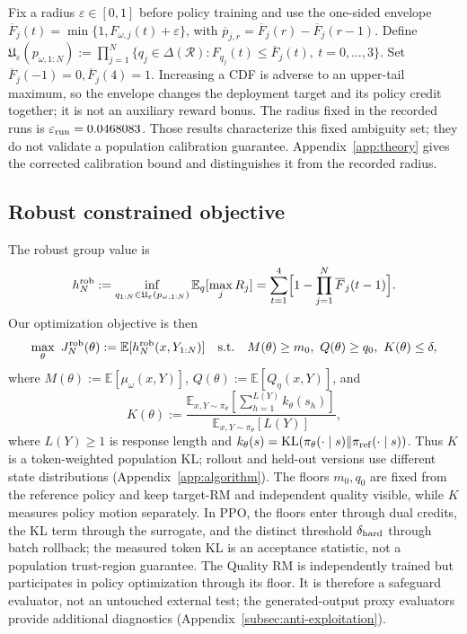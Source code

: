 \documentclass{article}
\theoremstyle{definition}
\theoremstyle{remark}
\begin{document}
Fix a radius \(\varepsilon\in[0,1]\) before policy training and use the
one-sided envelope
\(\overline F_j(t)=\min\{1,F_{\omega,j}(t)+\varepsilon\}\), with
\(\overline p_{j,r}=\overline F_j(r)-\overline F_j(r-1)\).  Define
\(\mathfrak U_{\varepsilon}(p_{\omega,1:N})
:=\prod_{j=1}^{N}\{q_j\in\Delta(\mathcal R):
F_{q_j}(t)\le\overline F_j(t),\ t=0,\ldots,3\}\).  Set
\(\overline F_j(-1)=0,\overline F_j(4)=1\).  Increasing a CDF is adverse to an
upper-tail maximum, so the envelope changes the deployment target and its
policy credit together; it is not an auxiliary reward bonus. The radius
fixed in the recorded runs is \(\varepsilon_{\rm run}=0.0468083\).
Those results characterize this fixed ambiguity set; they do not validate a
population calibration guarantee. Appendix~\ref{app:theory} gives the corrected
calibration bound and distinguishes it from the recorded radius.

\subsection{Robust constrained objective}
The robust group value is
\begin{equation}
\label{eq:robust-group-value}
h_N^{\rm rob}
:=\inf_{q_{1:N}\in\mathfrak U_{\varepsilon}(p_{\omega,1:N})}
\mathbb E_q[\max_jR_j]
=\sum_{t=1}^{4}\Bigl[1-\prod_{j=1}^{N}\overline F_j(t-1)\Bigr].
\end{equation}
Our optimization objective is then
\begin{equation}
\label{eq:robust-max-closed}
\max_{\theta}\ J_N^{\rm rob}(\theta)
:=\mathbb E[h_N^{\rm rob}(x,Y_{1:N})]
\quad\text{s.t.}\quad
M(\theta)\ge m_0,\ Q(\theta)\ge q_0,\ K(\theta)\le\delta,
\end{equation}
where
\(M(\theta):=\mathbb E[\mu_\omega(x,Y)]\),
\(Q(\theta):=\mathbb E[Q_\eta(x,Y)]\), and
\[
K(\theta):=\frac{\mathbb E_{x,Y\sim\pi_\theta}[\sum_{h=1}^{L(Y)}k_\theta(s_h)]}
{\mathbb E_{x,Y\sim\pi_\theta}[L(Y)]},
\]
where \(L(Y)\ge1\) is response length and
\(k_\theta(s)=\mathrm{KL}(\pi_\theta(\cdot\mid s)\Vert\pi_{\rm ref}(\cdot\mid s))\).
Thus \(K\) is a token-weighted population KL; rollout and held-out versions
use different state distributions (Appendix~\ref{app:algorithm}).
The floors \(m_0,q_0\) are fixed from the reference policy and keep target-RM
and independent quality visible, while \(K\) measures policy motion separately.
In PPO, the floors enter through dual credits, the KL term through the
surrogate, and the distinct threshold \(\delta_{\rm hard}\) through batch
rollback; the measured token KL is an acceptance statistic, not a population
trust-region guarantee.  The Quality RM is independently trained but participates in policy optimization
through its floor. It is therefore a safeguard evaluator, not an untouched
external test; the generated-output proxy evaluators provide additional
diagnostics (Appendix~\ref{subsec:anti-exploitation}).
\end{document}

